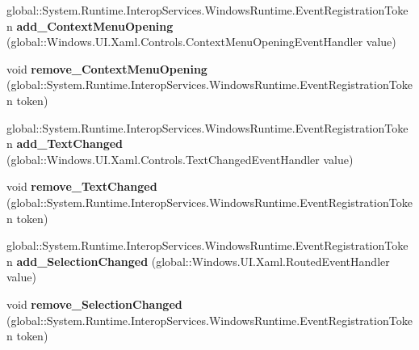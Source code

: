 \begin{DoxyCompactItemize}
\mbox{\label{interface_windows_1_1_u_i_1_1_xaml_1_1_controls_1_1_i_text_box_a13a0570373297c92254b50875850cec9}} 
global\+::\+System.\+Runtime.\+Interop\+Services.\+Windows\+Runtime.\+Event\+Registration\+Token {\bfseries add\+\_\+\+Context\+Menu\+Opening} (global\+::\+Windows.\+U\+I.\+Xaml.\+Controls.\+Context\+Menu\+Opening\+Event\+Handler value)
\item 
\mbox{\label{interface_windows_1_1_u_i_1_1_xaml_1_1_controls_1_1_i_text_box_a51914ddc8aa63000ce56d9ef69853f43}} 
void {\bfseries remove\+\_\+\+Context\+Menu\+Opening} (global\+::\+System.\+Runtime.\+Interop\+Services.\+Windows\+Runtime.\+Event\+Registration\+Token token)
\item 
\mbox{\label{interface_windows_1_1_u_i_1_1_xaml_1_1_controls_1_1_i_text_box_adfbfa844057a8d451f7ce00ca1632498}} 
global\+::\+System.\+Runtime.\+Interop\+Services.\+Windows\+Runtime.\+Event\+Registration\+Token {\bfseries add\+\_\+\+Text\+Changed} (global\+::\+Windows.\+U\+I.\+Xaml.\+Controls.\+Text\+Changed\+Event\+Handler value)
\item 
\mbox{\label{interface_windows_1_1_u_i_1_1_xaml_1_1_controls_1_1_i_text_box_a32cd181527e79d8b2154c89ea0984dea}} 
void {\bfseries remove\+\_\+\+Text\+Changed} (global\+::\+System.\+Runtime.\+Interop\+Services.\+Windows\+Runtime.\+Event\+Registration\+Token token)
\item 
\mbox{\label{interface_windows_1_1_u_i_1_1_xaml_1_1_controls_1_1_i_text_box_a981d451491963f006453c0c0b14a8fda}} 
global\+::\+System.\+Runtime.\+Interop\+Services.\+Windows\+Runtime.\+Event\+Registration\+Token {\bfseries add\+\_\+\+Selection\+Changed} (global\+::\+Windows.\+U\+I.\+Xaml.\+Routed\+Event\+Handler value)
\item 
\mbox{\label{interface_windows_1_1_u_i_1_1_xaml_1_1_controls_1_1_i_text_box_a3cb1d0fb9f12435f1a1ccee943050023}} 
void {\bfseries remove\+\_\+\+Selection\+Changed} (global\+::\+System.\+Runtime.\+Interop\+Services.\+Windows\+Runtime.\+Event\+Registration\+Token token)

\end{DoxyCompactItemize}
